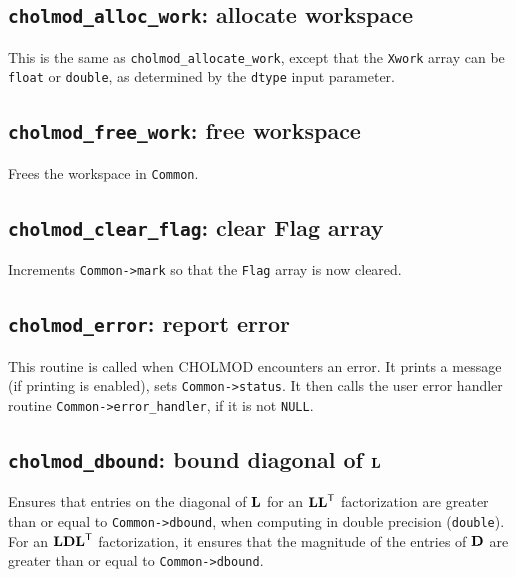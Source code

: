 \documentclass[11pt]{article}
\newcommand{\m}[1]{{\bf{#1}}}       %
\newcommand{\tr}{^{\sf T}}          %
\begin{document}
\subsection{{\tt cholmod\_alloc\_work}: allocate workspace}


This is the same as {\tt cholmod\_allocate\_work}, except that
the {\tt Xwork} array can be {\tt float} or {\tt double}, as
determined by the {\tt dtype} input parameter.

\subsection{{\tt cholmod\_free\_work}: free workspace}


Frees the workspace in {\tt Common}.

\subsection{{\tt cholmod\_clear\_flag}: clear Flag array}


Increments {\tt Common->mark} so that the {\tt Flag} array is now cleared.

\subsection{{\tt cholmod\_error}: report error}


This routine is called when CHOLMOD encounters an error.  It prints a message
(if printing is enabled), sets {\tt Common->status}.  It then calls the user
error handler routine {\tt Common->error\_handler}, if it is not {\tt NULL}.

\subsection{{\tt cholmod\_dbound}: bound diagonal of $\m{L}$}


Ensures that entries on the diagonal of $\m{L}$ for an $\m{LL}\tr$
factorization are greater than or equal to {\tt Common->dbound},
when computing in double precision ({\tt double}).
For an $\m{LDL}\tr$ factorization, it ensures that the magnitude
of the entries of $\m{D}$ are greater than or equal to {\tt Common->dbound}.
\end{document}
